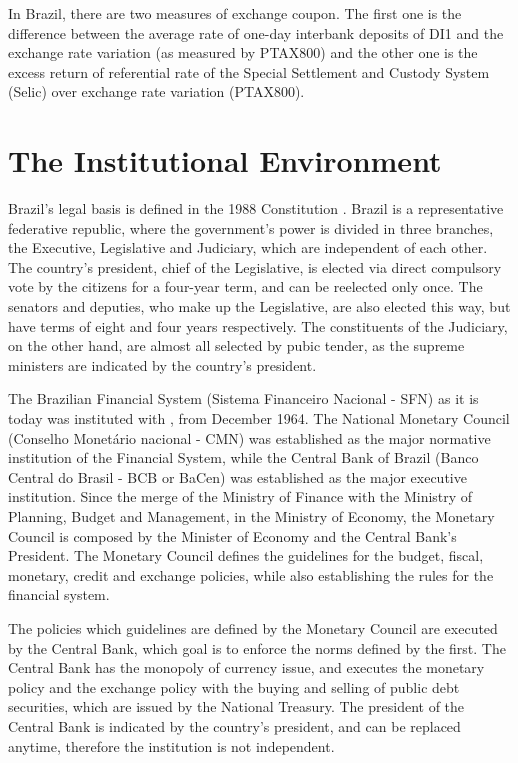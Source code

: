 \documentclass[a4paper]{article}
\begin{document}
In Brazil, there are two measures of exchange coupon. The first one is the difference between the average rate of one-day interbank deposits of DI1 and the exchange rate variation (as measured by PTAX800) and the other one is the excess return of referential rate of the Special Settlement and Custody System (Selic) over exchange rate variation (PTAX800).


\section{The Institutional Environment}


Brazil's legal basis is defined in the 1988 Constitution \citet{constituicao}. Brazil is a representative federative republic, where the government's power is divided in three branches, the Executive, Legislative and Judiciary, which are independent of each other. The country's president, chief of the Legislative, is elected via direct compulsory vote by the citizens for a four-year term, and can be reelected only once. The senators and deputies, who make up the Legislative, are also elected this way, but have terms of eight and four years respectively. The constituents of the Judiciary, on the other hand, are almost all selected by pubic tender, as the supreme ministers are indicated by the country's president.

The Brazilian Financial System (Sistema Financeiro Nacional - SFN) as it is today was instituted with \citet{lei4595}, from December 1964. The National Monetary Council (Conselho Monetário nacional - CMN) was established as the major normative institution of the Financial System, while the Central Bank of Brazil (Banco Central do Brasil - BCB or BaCen) was established as the major executive institution. Since the merge of the Ministry of Finance with the Ministry of Planning, Budget and Management, in the Ministry of Economy, the Monetary Council is composed by the Minister of Economy and the Central Bank's President. The Monetary Council defines the guidelines for the budget, fiscal, monetary, credit and exchange policies, while also establishing the rules for the financial system.

The policies which guidelines are defined by the Monetary Council are executed by the Central Bank, which goal is to enforce the norms defined by the first. The Central Bank has the monopoly of currency issue, and executes the monetary policy and the exchange policy with the buying and selling of public debt securities, which are issued by the National Treasury. The president of the Central Bank is indicated by the country's president, and can be replaced anytime, therefore the institution is not independent.
\end{document}
